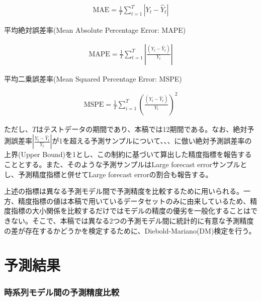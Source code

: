 \documentclass[a4paper, 12pt]{jsarticle}
\begin{document}
\begin{equation}
  \begin{split}
    \text{MAE} = \frac {1} {T} \sum^{T}_{t=1}\left| Y_t - \hat{Y}_t \right|
  \end{split}
\end{equation}

平均絶対誤差率(Mean Absolute Percentage Error: MAPE)

\begin{equation}
  \begin{split}
    \text{MAPE} = \frac {1} {T} \sum^{T}_{t=1}\left| \frac {(Y_t - \hat{Y}_t)} {Y_t} \right|
  \end{split}
\end{equation}

平均二乗誤差率(Mean Squared Percentage Error: MSPE)

\begin{equation}
  \begin{split}
    \text{MSPE} = \frac {1} {T} \sum^{T}_{i=1} \left( \frac { ( Y_t - \hat{Y}_t)} {Y_t} \right) ^2
  \end{split}
\end{equation}

ただし、$T$はテストデータの期間であり、本稿では12期間である。なお、絶対予測誤差率$ \left| \frac{Y_t -{\hat Y}_t}{Y_t} \right|$が1を超える予測サンプルについて、\cite*{brown1979univariate}、\cite*{lorek1996multivariate}、\cite{zhang2004neural}に倣い絶対予測誤差率の上界(Upper Bound)を1とし、この制約に基づいて算出した精度指標を報告することとする。また、そのような予測サンプルはLarge forecast errorサンプルとし、予測精度指標と併せてLarge forecast errorの割合も報告する。

上述の指標は異なる予測モデル間で予測精度を比較するために用いられる。一方、精度指標の値は本稿で用いているデータセットのみに由来しているため、精度指標の大小関係を比較するだけではモデルの精度の優劣を一般化することはできない。そこで、本稿では異なる2つの予測モデル間に統計的に有意な予測精度の差が存在するかどうかを検定するために、Diebold-Mariano(DM)検定\cite*{diebold2002comparing}を行う。

\part{予測結果}

\section{時系列モデル間の予測精度比較}
\end{document}
